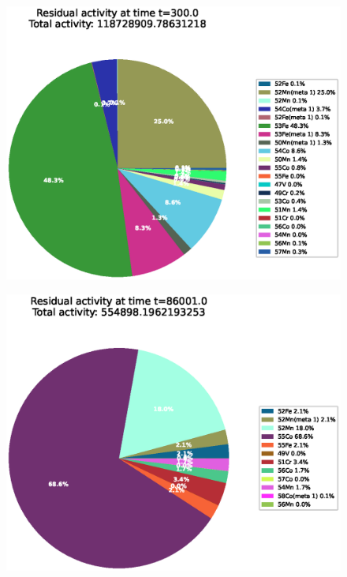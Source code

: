 \begin{figure}[!htb]
\centering
\includegraphics[width=0.8\linewidth]{chapters/results_activity_code/fe-activity-v2/residual-activity/0100_300.eps}
\caption{}
\label{fig:activity-v2-residual-activity-300s}
\end{figure}

\begin{figure}[!htb]
\centering
\includegraphics[width=0.8\linewidth]{chapters/results_activity_code/fe-activity-v2/residual-activity/0166_86001.eps}
\caption{}
\label{fig:activity-v2-residual-activity-86001s}
\end{figure}


